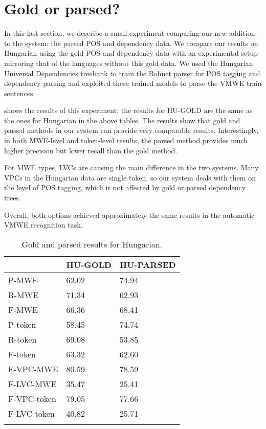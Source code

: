\documentclass[output=paper,
modfonts,
]{langscibook}
\begin{document}
\section{Gold or parsed?}
\label{goldorparsed}

In this last section, we describe a small experiment comparing our new addition to the system: the parsed POS and dependency data. We compare our results on Hungarian using the gold POS and dependency data with an experimental setup mirroring that of the languages without this gold data. We used the Hungarian Universal Dependencies treebank to train the Bohnet parser for POS tagging and dependency parsing and exploited these trained models to parse the VMWE train sentences. 

 shows the results of this experiment; the results for HU-GOLD are the same as the ones for Hungarian in the above tables. The results show that gold and parsed methods in our system can provide very comparable results. Interestingly, in both MWE-level and token-level results, the parsed method provides much higher precision but lower recall than the gold method. 

For MWE types, LVCs are causing the main difference in the two systems. Many VPCs in the Hungarian data are single token, so our system deals with them on the level of POS tagging, which is not affected by gold or parsed dependency trees.

Overall, both options achieved approximately the same results in the automatic VMWE recognition task.

\begin{table}
\centering
\caption{Gold and parsed results for Hungarian.}
\label{goldvsparsed}
\begin{tabular}{lll}
  \lsptoprule
& HU-GOLD        & HU-PARSED \\
 \midrule
P-MWE      & 62.02 & 74.94\\
R-MWE      & 71.34 & 62.93\\
F-MWE      & 66.36 & 68.41\\
\midrule
P-token    & 58.45 & 74.74\\
R-token    & 69.08 & 53.85\\
F-token    & 63.32 & 62.60\\
\midrule 
F-VPC-MWE    & 80.59 & 78.59\\
F-LVC-MWE    & 35.47 & 25.41\\
\midrule 
F-VPC-token  & 79.05 & 77.66\\
F-LVC-token  & 40.82 & 25.71\\

  \lspbottomrule
\end{tabular}
\end{table}
\end{document}
